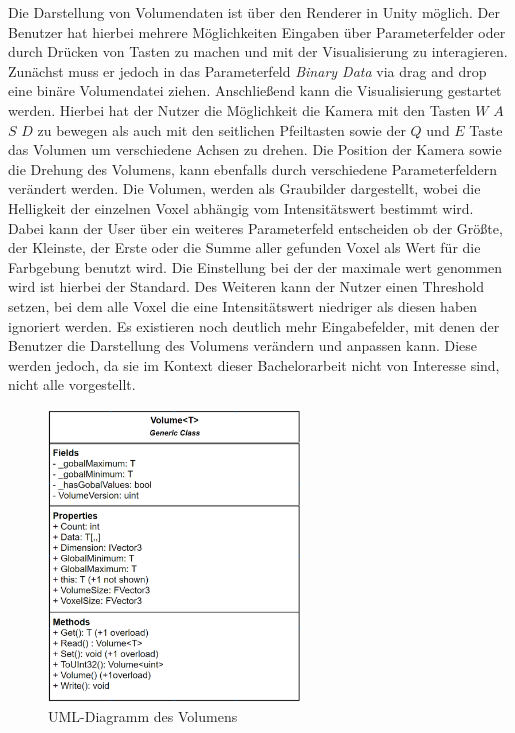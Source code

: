 Die Darstellung von Volumendaten ist über den Renderer in Unity möglich. Der Benutzer hat hierbei mehrere Möglichkeiten Eingaben über Parameterfelder oder durch Drücken von Tasten zu machen und mit der Visualisierung zu interagieren. Zunächst muss er jedoch in das Parameterfeld \textit{Binary Data} via drag and drop eine binäre Volumendatei ziehen. Anschließend kann die Visualisierung gestartet werden. Hierbei hat der Nutzer die Möglichkeit die Kamera mit den Tasten $W$ $A$ $S$ $D$ zu bewegen als auch mit den seitlichen Pfeiltasten sowie der $Q$ und $E$ Taste das Volumen um verschiedene Achsen zu drehen. Die Position der Kamera sowie die Drehung des Volumens, kann ebenfalls durch verschiedene Parameterfeldern verändert werden.
\newline
Die Volumen, werden als Graubilder dargestellt, wobei die Helligkeit der einzelnen Voxel abhängig vom Intensitätswert bestimmt wird. Dabei kann der User über ein weiteres Parameterfeld entscheiden ob der Größte, der Kleinste, der Erste oder die Summe aller gefunden Voxel als Wert für die Farbgebung benutzt wird. Die Einstellung bei der der maximale wert genommen wird ist hierbei der Standard. Des Weiteren kann der Nutzer einen Threshold setzen, bei dem alle Voxel die eine Intensitätswert niedriger als diesen haben ignoriert werden.
\newline
Es existieren noch deutlich mehr Eingabefelder, mit denen der Benutzer die Darstellung des Volumens verändern und anpassen kann. Diese werden jedoch, da sie im Kontext dieser Bachelorarbeit nicht von Interesse sind, nicht alle vorgestellt.


\begin{figure}
\centering
\includegraphics[width=0.6\textwidth]{Logos/Volume_UML.PNG}
\caption{UML-Diagramm des Volumens} 
\label{fig:volume_uml} 
\end{figure}


